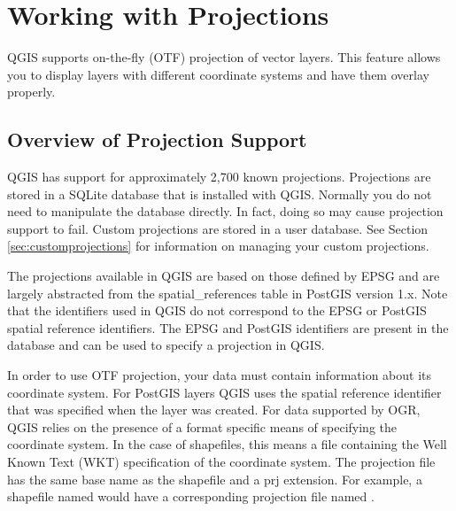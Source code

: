 
\section{Working with Projections}\label{label_projections}

QGIS supports on-the-fly (OTF) projection of vector layers. This feature allows you
to display layers with different coordinate systems and have them overlay
properly.

\subsection{Overview of Projection Support}\label{label_projoverview}

QGIS has support for approximately 2,700 known projections. 
Projections are stored in a SQLite database that is installed with QGIS.
Normally you do not need to manipulate the database directly. In fact,
doing so may cause projection support to fail. Custom projections are
stored in a user database. See Section \ref{sec:customprojections} for
information on managing your custom projections.

The projections available in QGIS are based on those defined by
EPSG and are
largely abstracted from the spatial\_references table in
PostGIS version 1.x.
Note that the identifiers used in QGIS do not correspond to the EPSG or
PostGIS spatial reference identifiers. The EPSG and PostGIS identifiers are
present in the database and can be used to specify a projection in QGIS.

In order to use OTF projection, your data must contain information about its
coordinate system. For PostGIS layers QGIS uses the spatial reference
identifier that was specified when the layer was created. For data supported
by OGR, QGIS relies on the presence of a format specific means of specifying
the coordinate system. In the case of shapefiles, this means a file containing
the Well Known Text (WKT) specification of the coordinate
system. The
projection file has the same base name as the shapefile and a prj extension.
For example, a shapefile named  would have a corresponding projection
file named .


